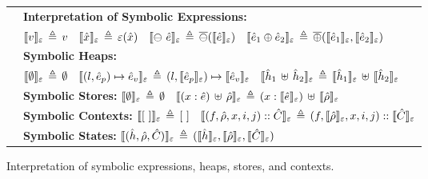 \begin{figure}[!h]
{
\begin{tabular}{l}
$\quad${\bf Interpretation of Symbolic Expressions:}  \\
$
\quad
\llbracket v \rrbracket_{\varepsilon} \,\triangleq\, v
\quad 
\llbracket \hat{x} \rrbracket_{\varepsilon} \,\triangleq\, \varepsilon(\hat{x})
\quad 
\llbracket \ominus\ \hat{e} \rrbracket_{\varepsilon} \,\triangleq\, \overline{\ominus} (\llbracket \hat{e} \rrbracket_{\varepsilon})
\quad 
\llbracket \hat{e}_1 \oplus \hat{e}_2 \rrbracket_{\varepsilon} \,\triangleq\, \overline{\oplus}(\llbracket \hat{e}_1 \rrbracket_{\varepsilon}, \llbracket \hat{e}_2 \rrbracket_{\varepsilon}) 
$
\\[3pt]
$\quad${\bf Symbolic Heaps:}  \\
$
\quad
 \llbracket \emptyset \rrbracket_{\varepsilon} \,\triangleq\, \emptyset
\quad
\llbracket (l, \hat{e}_p) \mapsto \hat{e}_v \rrbracket_{\varepsilon} \,\triangleq\,  (l, \llbracket \hat{e}_p \rrbracket_{\varepsilon}) \mapsto \llbracket \hat{e}_v \rrbracket_{\varepsilon}
\quad
\llbracket \hat{h}_1 \, \uplus \, \hat{h}_2 \rrbracket_{\varepsilon} \,\triangleq\,  \llbracket \hat{h}_1 \rrbracket_{\varepsilon} \, \uplus \, \llbracket \hat{h}_2 \rrbracket_{\varepsilon}
$%
\\[3pt]
$\quad${\bf Symbolic Stores:}  
$
 \llbracket \emptyset \rrbracket_{\varepsilon} \,\triangleq\, \emptyset
\quad 
 \llbracket (x: \hat{e}) \, \uplus \, \hat\rho \rrbracket_{\varepsilon} \,\triangleq\, (x: \llbracket \hat{e} \rrbracket_{\varepsilon}) \, \uplus \, \llbracket \hat\rho \rrbracket_{\varepsilon}
$%
\\[3pt]
$\quad${\bf Symbolic Contexts:}  
$ \llbracket [ \ ] \rrbracket_{\varepsilon} \,\triangleq\, [ \ ]
\quad 
 \llbracket (f, \hat\rho, x, i, j) :: \hat{C} \rrbracket_{\varepsilon} \,\triangleq\, (f, \llbracket \hat\rho \rrbracket_{\varepsilon}, x, i, j) :: \llbracket \hat{C} \rrbracket_{\varepsilon}
$%

\\[3pt]
$\quad${\bf Symbolic States:}  $\llbracket (\hat{h}, \hat\rho, \hat{C}) \rrbracket_{\varepsilon} \,\triangleq\, (\llbracket \hat{h} \rrbracket_{\varepsilon}, \llbracket \hat\rho \rrbracket_{\varepsilon}, \llbracket \hat{C} \rrbracket_{\varepsilon})$
\end{tabular}
}
\caption{Interpretation of symbolic expressions, heaps, stores, and contexts.\label{fig:symbolic:interp}}
\vspace{-0.5cm}
\end{figure}

